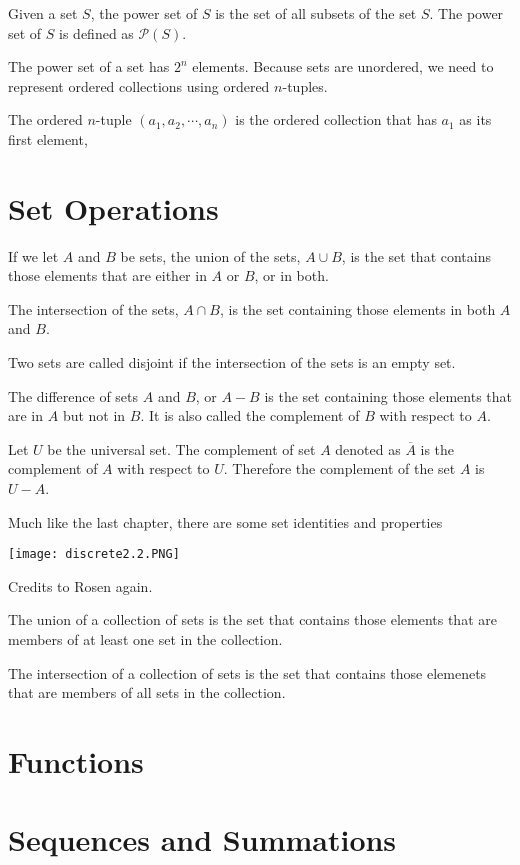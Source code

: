 \documentclass[../discrete.tex]{subfiles}
\begin{document}
\begin{definition}
    Given a set $S$, the power set of $S$ is the set of all subsets of the set $S$. The power set of $S$ is defined as $\mathcal{P}(S)$.
\end{definition}
The power set of a set has $2^n$ elements. Because sets are unordered, we need to represent ordered collections using ordered $n$-tuples.
\begin{definition}
    The ordered $n$-tuple $(a_1, a_2,\cdots,a_n)$ is the ordered collection that has $a_1$ as its first element, 
\end{definition}
\section{Set Operations}
If we let $A$ and $B$ be sets, the union of the sets, $A\cup B$, is the set that contains those elements that are either in $A$ or $B$, or in both.

The intersection of the sets, $A\cap B$, is the set containing those elements in both $A$ and $B$.

Two sets are called disjoint if the intersection of the sets is an empty set.

The difference of sets $A$ and $B$, or $A-B$ is the set containing those elements that are in $A$ but not in $B$. It is also called the complement of $B$ with respect to $A$.

\begin{definition}
    Let $U$ be the universal set. The complement of set $A$ denoted as $\overline{A}$ is the complement of $A$ with respect to $U$. Therefore the complement of the set $A$ is $U-A$.
\end{definition}

Much like the last chapter, there are some set identities and properties
\begin{center}
    \texttt{[image: discrete2.2.PNG]}
\end{center}
Credits to Rosen again.

The union of a collection of sets is the set that contains those elements that are members of at least one set in the collection.

The intersection of a collection of sets is the set that contains those elemenets that are members of all sets in the collection.
\section{Functions}
\section{Sequences and Summations}
\end{document}
